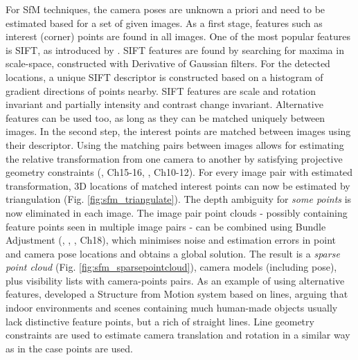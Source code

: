 For SfM techniques, the camera poses are unknown a priori and need to be estimated based for a set of given images. As a first stage, features such as interest (corner) points are found in all images. One of the most popular features is SIFT, as introduced by . SIFT features are found by searching for maxima in scale-space, constructed with Derivative of Gaussian filters. For the detected locations, a unique SIFT descriptor is constructed based on a histogram of gradient directions of points nearby. SIFT features are scale and rotation invariant and partially intensity and contrast change invariant. Alternative features can be used too, as long as they can be matched uniquely between images. In the second step, the interest points are matched between images using their descriptor. Using the matching pairs between images allows for estimating the relative transformation from one camera to another by satisfying projective geometry constraints (, Ch15-16, , Ch10-12). For every image pair with estimated transformation, 3D locations of matched interest points can now be estimated by triangulation (Fig. \ref{fig:sfm_triangulate}). The depth ambiguity for \emph{some points} is now eliminated in each image. The image pair point clouds - possibly containing feature points seen in multiple image pairs - can be combined using Bundle Adjustment (\eg, , , Ch18), which minimises noise and estimation errors in point and camera pose locations and obtains a global solution. The result is a \emph{sparse point cloud} (Fig. \ref{fig:sfm_sparsepointcloud}), camera models (including pose), plus visibility lists with camera-points pairs.
As an example of using alternative features,  developed a Structure from Motion system based on lines, arguing that indoor environments and scenes containing much human-made objects usually lack distinctive feature points, but a rich of straight lines. Line geometry constraints are used to estimate camera translation and rotation in a similar way as in the case points are used.

